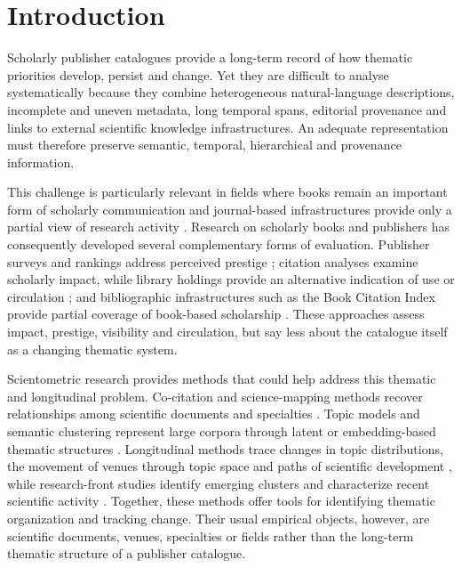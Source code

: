 \documentclass[futureinternet,article,submit,moreauthors]{Definitions/mdpi}
\begin{document}
\section{Introduction}\label{sec:introduction}

Scholarly publisher catalogues provide a long-term record of how thematic priorities develop, persist and change. Yet they are difficult to analyse systematically because they combine heterogeneous natural-language descriptions, incomplete and uneven metadata, long temporal spans, editorial provenance and links to external scientific knowledge infrastructures. An adequate representation must therefore preserve semantic, temporal, hierarchical and provenance information.

This challenge is particularly relevant in fields where books remain an important form of scholarly communication and journal-based infrastructures provide only a partial view of research activity \citep{hicks2004four,kulczycki2018publication,engels2018books}. Research on scholarly books and publishers has consequently developed several complementary forms of evaluation. Publisher surveys and rankings address perceived prestige \citep{gimenez2013publishers}; citation analyses examine scholarly impact, while library holdings provide an alternative indication of use or circulation \citep{white2009libcitations,kousha2011books}; and bibliographic infrastructures such as the Book Citation Index provide partial coverage of book-based scholarship \citep{torres2014bookcitation}. These approaches assess impact, prestige, visibility and circulation, but say less about the catalogue itself as a changing thematic system.

Scientometric research provides methods that could help address this thematic and longitudinal problem. Co-citation and science-mapping methods recover relationships among scientific documents and specialties \citep{price1965networks,small1973cocitation,chen2006citespace}. Topic models and semantic clustering represent large corpora through latent or embedding-based thematic structures \citep{blei2003lda,blei2006dynamic,grootendorst2022bertopic}. Longitudinal methods trace changes in topic distributions, the movement of venues through topic space and paths of scientific development \citep{schaefermeier2021topicspace,kim2022trajectories}, while research-front studies identify emerging clusters and characterize recent scientific activity \citep{boyack2010front,small2014emerging,rotolo2015emerging}. Together, these methods offer tools for identifying thematic organization and tracking change. Their usual empirical objects, however, are scientific documents, venues, specialties or fields rather than the long-term thematic structure of a publisher catalogue.
\end{document}
